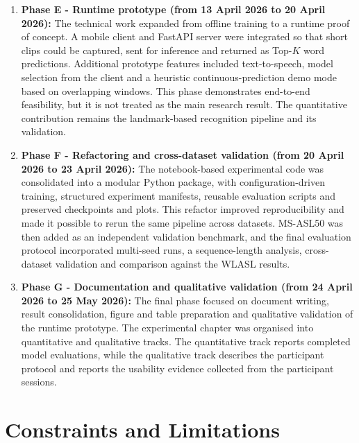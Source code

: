 \begin{enumerate}
    \item \textbf{Phase E - Runtime prototype (from 13 April 2026 to 20 April 2026):} The technical work
          expanded from offline training to a runtime proof of concept. A mobile client and FastAPI
          server were integrated so that short clips could be captured, sent for inference and
          returned as Top-$K$ word predictions. Additional prototype features included
          text-to-speech, model selection from the client and a heuristic continuous-prediction demo
          mode based on overlapping windows. This phase demonstrates end-to-end feasibility, but it
          is not treated as the main research result. The quantitative contribution remains the
          landmark-based recognition pipeline and its validation.

    \item \textbf{Phase F - Refactoring and cross-dataset validation (from 20 April 2026 to 23 April 2026):}
          The notebook-based experimental code was consolidated into a modular Python package, with
          configuration-driven training, structured experiment manifests, reusable evaluation
          scripts and preserved checkpoints and plots. This refactor improved reproducibility and
          made it possible to rerun the same pipeline across datasets. MS-ASL50 was then added as an
          independent validation benchmark, and the final evaluation protocol incorporated
          multi-seed runs, a sequence-length analysis, cross-dataset validation and comparison
          against the WLASL results.

    \item \textbf{Phase G - Documentation and qualitative validation (from 24 April 2026 to 25 May 2026):}
          The final phase focused on document writing, result consolidation, figure and table
          preparation and qualitative validation of the runtime prototype. The experimental chapter
          was organised into quantitative and qualitative tracks. The quantitative track reports
          completed model evaluations, while the qualitative track describes the participant
          protocol and reports the usability evidence collected from the participant sessions.
\end{enumerate}

\FloatBarrier

\section{Constraints and Limitations}
\label{sec:plan_constraints}

